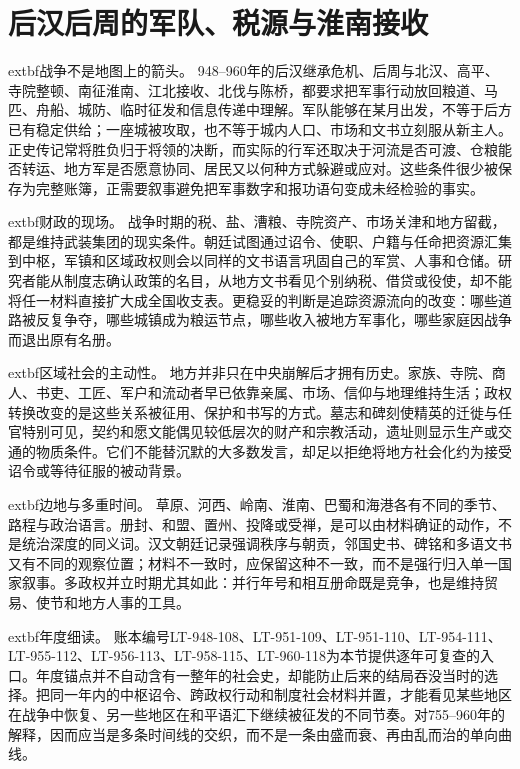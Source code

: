 \section{后汉后周的军队、税源与淮南接收}
\label{sec:later-five-dynasties-armies-tax}

\noindent	extbf{战争不是地图上的箭头。} 948--960年的后汉继承危机、后周与北汉、高平、寺院整顿、南征淮南、江北接收、北伐与陈桥，都要求把军事行动放回粮道、马匹、舟船、城防、临时征发和信息传递中理解。军队能够在某月出发，不等于后方已有稳定供给；一座城被攻取，也不等于城内人口、市场和文书立刻服从新主人。正史传记常将胜负归于将领的决断，而实际的行军还取决于河流是否可渡、仓粮能否转运、地方军是否愿意协同、居民又以何种方式躲避或应对。这些条件很少被保存为完整账簿，正需要叙事避免把军事数字和报功语句变成未经检验的事实。

\noindent	extbf{财政的现场。} 战争时期的税、盐、漕粮、寺院资产、市场关津和地方留截，都是维持武装集团的现实条件。朝廷试图通过诏令、使职、户籍与任命把资源汇集到中枢，军镇和区域政权则会以同样的文书语言巩固自己的军赏、人事和仓储。研究者能从制度志确认政策的名目，从地方文书看见个别纳税、借贷或役使，却不能将任一材料直接扩大成全国收支表。更稳妥的判断是追踪资源流向的改变：哪些道路被反复争夺，哪些城镇成为粮运节点，哪些收入被地方军事化，哪些家庭因战争而退出原有名册。

\noindent	extbf{区域社会的主动性。} 地方并非只在中央崩解后才拥有历史。家族、寺院、商人、书吏、工匠、军户和流动者早已依靠亲属、市场、信仰与地理维持生活；政权转换改变的是这些关系被征用、保护和书写的方式。墓志和碑刻使精英的迁徙与任官特别可见，契约和愿文能偶见较低层次的财产和宗教活动，遗址则显示生产或交通的物质条件。它们不能替沉默的大多数发言，却足以拒绝将地方社会化约为接受诏令或等待征服的被动背景。

\noindent	extbf{边地与多重时间。} 草原、河西、岭南、淮南、巴蜀和海港各有不同的季节、路程与政治语言。册封、和盟、置州、投降或受禅，是可以由材料确证的动作，不是统治深度的同义词。汉文朝廷记录强调秩序与朝贡，邻国史书、碑铭和多语文书又有不同的观察位置；材料不一致时，应保留这种不一致，而不是强行归入单一国家叙事。多政权并立时期尤其如此：并行年号和相互册命既是竞争，也是维持贸易、使节和地方人事的工具。

\noindent	extbf{年度细读。} 账本编号LT-948-108、LT-951-109、LT-951-110、LT-954-111、LT-955-112、LT-956-113、LT-958-115、LT-960-118为本节提供逐年可复查的入口。年度锚点并不自动含有一整年的社会史，却能防止后来的结局吞没当时的选择。把同一年内的中枢诏令、跨政权行动和制度社会材料并置，才能看见某些地区在战争中恢复、另一些地区在和平语汇下继续被征发的不同节奏。对755--960年的解释，因而应当是多条时间线的交织，而不是一条由盛而衰、再由乱而治的单向曲线。

